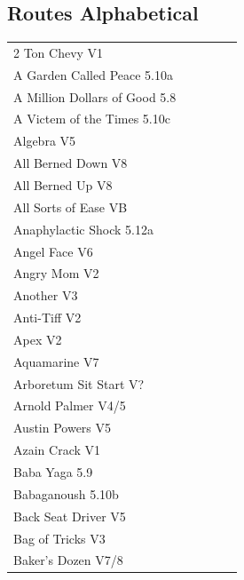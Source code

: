 \begin{flushleft}
\needspace{1.5cm}
\section{Routes Alphabetical}
\begin{center}
\begin{supertabular}{p{0.76\linewidth}p{0.08\linewidth}}
2 Ton Chevy V1 & \pageref{rt:2 Ton Chevy} \\
A Garden Called Peace 5.10a & \pageref{rt:A Garden Called Peace} \\
A Million Dollars of Good 5.8 & \pageref{rt:A Million Dollars of Good} \\
A Victem of the Times 5.10c & \pageref{vr:A Victem of the Times} \\
Algebra V5 & \pageref{rt:Algebra} \\
All Berned Down V8 & \pageref{rt:All Berned Down} \\
All Berned Up V8 & \pageref{rt:All Berned Up} \\
All Sorts of Ease VB & \pageref{rt:All Sorts of Ease} \\
Anaphylactic Shock 5.12a & \pageref{rt:Anaphylactic Shock} \\
Angel Face V6 & \pageref{rt:Angel Face} \\
Angry Mom V2 & \pageref{rt:Angry Mom} \\
Another V3 & \pageref{rt:Another} \\
Anti-Tiff V2 & \pageref{rt:Anti-Tiff} \\
Apex V2 & \pageref{rt:Apex} \\
Aquamarine V7 & \pageref{rt:Aquamarine} \\
Arboretum Sit Start V? & \pageref{vr:Arboretum Sit Start} \\
Arnold Palmer V4/5 & \pageref{vr:Arnold Palmer} \\
Austin Powers V5 & \pageref{rt:Austin Powers} \\
Azain Crack V1 & \pageref{vr:Azain Crack} \\
Baba Yaga 5.9 & \pageref{rt:Baba Yaga} \\
Babaganoush 5.10b & \pageref{rt:Babaganoush} \\
Back Seat Driver V5 & \pageref{rt:Back Seat Driver} \\
Bag of Tricks V3 & \pageref{vr:Bag of Tricks} \\
Baker's Dozen V7/8 & \pageref{vr:Baker's Dozen} \\

\end{supertabular}
\end{center}
\end{flushleft}
